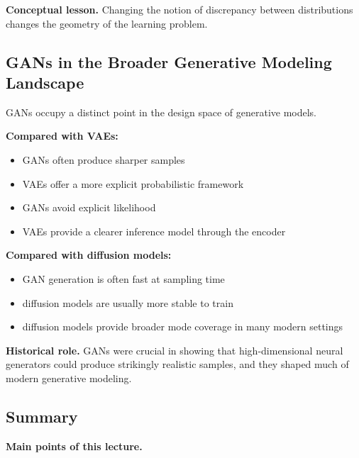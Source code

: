 \medskip

\noindent
\textbf{Conceptual lesson.}
Changing the notion of discrepancy between distributions changes the geometry of the learning problem.

\subsection{GANs in the Broader Generative Modeling Landscape}

GANs occupy a distinct point in the design space of generative models.

\medskip

\noindent
\textbf{Compared with VAEs:}
\begin{itemize}
    \item GANs often produce sharper samples
    \item VAEs offer a more explicit probabilistic framework
    \item GANs avoid explicit likelihood
    \item VAEs provide a clearer inference model through the encoder
\end{itemize}

\medskip

\noindent
\textbf{Compared with diffusion models:}
\begin{itemize}
    \item GAN generation is often fast at sampling time
    \item diffusion models are usually more stable to train
    \item diffusion models provide broader mode coverage in many modern settings
\end{itemize}

\medskip

\noindent
\textbf{Historical role.}
GANs were crucial in showing that high-dimensional neural generators could produce strikingly realistic samples, and they shaped much of modern generative modeling.

\subsection{Summary}

\textbf{Main points of this lecture.}

